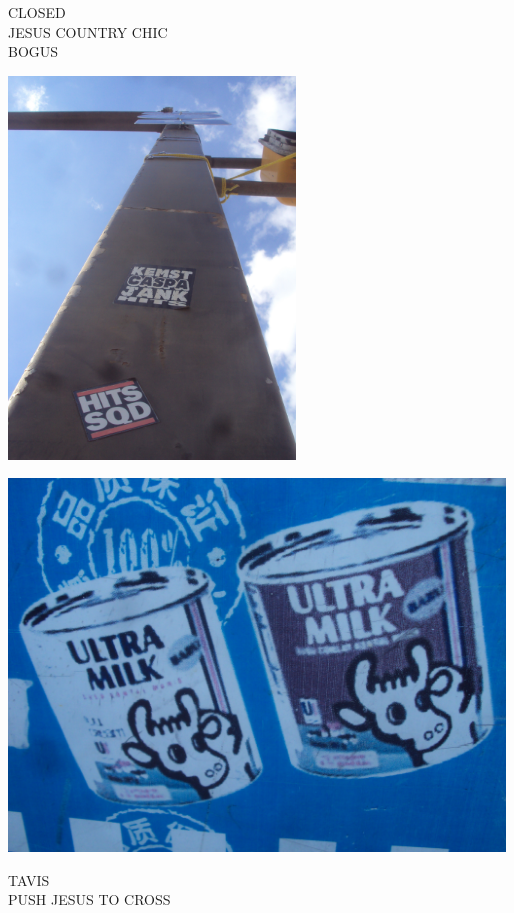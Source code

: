 \documentclass[10pt,letterpaper]{article}
\begin{document}
CLOSED\\
JESUS COUNTRY CHIC\\
BOGUS\\
\pagebreak

\includegraphics[height=4in]{portrait.jpg}

\vspace{0.25in}
\includegraphics[width=5.19in]{landscape.jpg}

TAVIS\\
PUSH JESUS TO CROSS\\
\pagebreak
\end{document}
